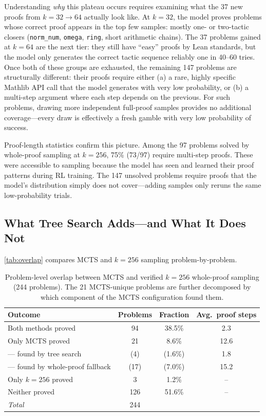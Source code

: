 \documentclass[openany, amssymb, psamsfonts]{amsart}
\theoremstyle{definition}
\numberwithin{equation}{section}
\begin{document}
Understanding \emph{why} this plateau occurs requires examining what the 37
new proofs from $k=32 \to 64$ actually look like.
At $k=32$, the model proves problems whose correct proof appears in the top
few samples: mostly one- or two-tactic closers (\texttt{norm\_num},
\texttt{omega}, \texttt{ring}, short arithmetic chains).
The 37 problems gained at $k=64$ are the next tier: they still have
``easy'' proofs by Lean standards, but the model only generates the correct
tactic sequence reliably one in 40--60 tries.
Once both of these groups are exhausted, the remaining 147 problems are
structurally different: their proofs require either (a) a rare, highly
specific Mathlib API call that the model generates with very low probability,
or (b) a multi-step argument where each step depends on the previous.
For such problems, drawing more independent full-proof samples provides no
additional coverage---every draw is effectively a fresh gamble with very
low probability of success.

Proof-length statistics confirm this picture.
Among the 97 problems solved by whole-proof sampling at $k=256$, 75\%
(73/97) require multi-step proofs.
These were accessible to sampling because the model has seen and learned
their proof patterns during RL training.
The 147 unsolved problems require proofs that the model's distribution
simply does not cover---adding samples only reruns the same low-probability
trials.

\subsection{What Tree Search Adds---and What It Does Not}
\label{sec:analysis_mcts}

\autoref{tab:overlap} compares MCTS and $k=256$ sampling problem-by-problem.

\begin{table}[h]
\centering
\caption{Problem-level overlap between MCTS and verified $k=256$ whole-proof
sampling (244 problems). The 21 MCTS-unique problems are further decomposed
by which component of the MCTS configuration found them.}
\label{tab:overlap}
\begin{tabular}{@{}lccc@{}}
\toprule
Outcome & Problems & Fraction & Avg.\ proof steps \\
\midrule
Both methods proved & 94 & 38.5\% & 2.3 \\
Only MCTS proved & 21 & 8.6\% & 12.6 \\
\quad --- found by tree search & (4) & (1.6\%) & 1.8 \\
\quad --- found by whole-proof fallback & (17) & (7.0\%) & 15.2 \\
Only $k=256$ proved & 3 & 1.2\% & -- \\
Neither proved & 126 & 51.6\% & -- \\
\midrule
\textit{Total} & 244 & & \\
\bottomrule
\end{tabular}
\end{table}
\end{document}
